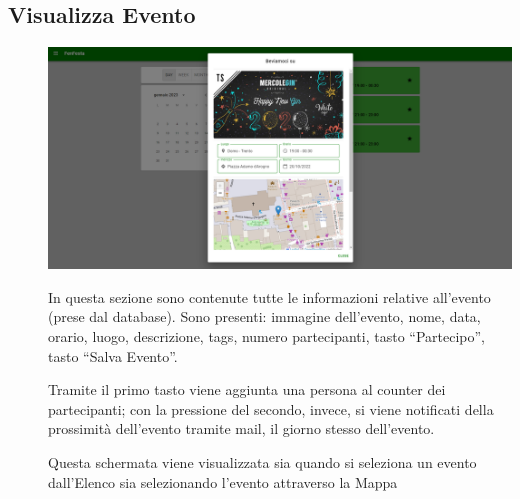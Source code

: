 \documentclass{article}
\begin{document}
\subsection{Visualizza Evento}
\begin{description}
    \item[] \begin{center}
            \includegraphics[scale=0.3]{Visualizza_Evento.png}
        \end{center}
    \item[] In questa sezione sono contenute tutte le informazioni relative all'evento (prese dal database). Sono presenti: immagine dell'evento, nome, data, orario, luogo, descrizione, tags, numero partecipanti, tasto “Partecipo”, tasto “Salva Evento”.
    \item[] Tramite il primo tasto viene aggiunta una persona al counter dei partecipanti; con la pressione del secondo, invece, si viene notificati della prossimità dell'evento tramite mail, il giorno stesso dell'evento.
    \item[] Questa schermata viene visualizzata sia quando si seleziona un evento dall'Elenco sia selezionando l'evento attraverso la Mappa
\end{description}
\end{document}
